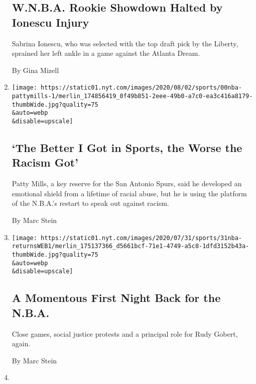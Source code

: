 \begin{enumerate}
  \hypertarget{wnba-rookie-showdown-halted-by-ionescu-injury}{%
  \subsection{W.N.B.A. Rookie Showdown Halted by Ionescu
  Injury}\label{wnba-rookie-showdown-halted-by-ionescu-injury}}

  Sabrina Ionescu, who was selected with the top draft pick by the
  Liberty, sprained her left ankle in a game against the Atlanta Dream.

  By Gina Mizell
\item
  \href{/2020/07/31/sports/basketball/spurs-patty-mills.html}{}

  \texttt{[image: https://static01.nyt.com/images/2020/08/02/sports/00nba-pattymills-1/merlin\_174856419\_0f49b851-2eee-49b0-a7c0-ea3c416a8179-thumbWide.jpg?quality=75\\\&auto=webp\\\&disable=upscale]}

  \hypertarget{the-better-i-got-in-sports-the-worse-the-racism-got}{%
  \subsection{`The Better I Got in Sports, the Worse the Racism
  Got'}\label{the-better-i-got-in-sports-the-worse-the-racism-got}}

  Patty Mills, a key reserve for the San Antonio Spurs, said he
  developed an emotional shield from a lifetime of racial abuse, but he
  is using the platform of the N.B.A.'s restart to speak out against
  racism.

  By Marc Stein
\item
  \href{/2020/07/31/sports/basketball/nba-opening-night.html}{}

  \texttt{[image: https://static01.nyt.com/images/2020/07/31/sports/31nba-returnsWEB1/merlin\_175137366\_d5661bcf-71e1-4749-a5c8-1dfd3152b43a-thumbWide.jpg?quality=75\\\&auto=webp\\\&disable=upscale]}

  \hypertarget{a-momentous-first-night-back-for-the-nba}{%
  \subsection{A Momentous First Night Back for the
  N.B.A.}\label{a-momentous-first-night-back-for-the-nba}}

  Close games, social justice protests and a principal role for Rudy
  Gobert, again.

  By Marc Stein
\item
  \href{/2020/07/30/sports/basketball/nba-knicks-coach-tom-thibodeau.html}{}


\end{enumerate}
